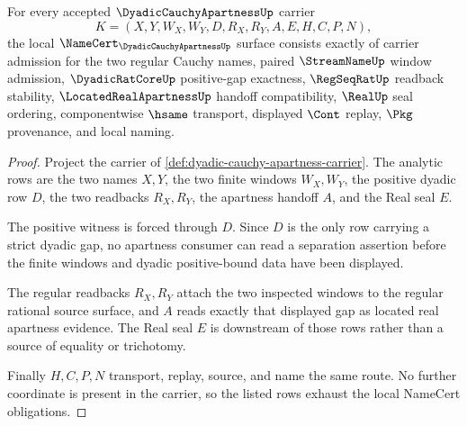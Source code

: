 \begin{theorem}
\label{thm:dyadic-cauchy-apartness-namecert-obligations}
For every accepted $\DyadicCauchyApartnessUp$ carrier
$$
K=(X,Y,W_X,W_Y,D,R_X,R_Y,A,E,H,C,P,N),
$$
the local $\NameCert_{\DyadicCauchyApartnessUp}$ surface consists exactly of carrier admission for the two regular Cauchy names, paired $\StreamNameUp$ window admission, $\DyadicRatCoreUp$ positive-gap exactness, $\RegSeqRatUp$ readback stability, $\LocatedRealApartnessUp$ handoff compatibility, $\RealUp$ seal ordering, componentwise $\hsame$ transport, displayed $\Cont$ replay, $\Pkg$ provenance, and local naming.
\end{theorem}
\begin{proof}
Project the carrier of \autoref{def:dyadic-cauchy-apartness-carrier}. The analytic rows are the two names $X,Y$, the two finite windows $W_X,W_Y$, the positive dyadic row $D$, the two readbacks $R_X,R_Y$, the apartness handoff $A$, and the Real seal $E$.

The positive witness is forced through $D$. Since $D$ is the only row carrying a strict dyadic gap, no apartness consumer can read a separation assertion before the finite windows and dyadic positive-bound data have been displayed.

The regular readbacks $R_X,R_Y$ attach the two inspected windows to the regular rational source surface, and $A$ reads exactly that displayed gap as located real apartness evidence. The Real seal $E$ is downstream of those rows rather than a source of equality or trichotomy.

Finally $H,C,P,N$ transport, replay, source, and name the same route. No further coordinate is present in the carrier, so the listed rows exhaust the local NameCert obligations.
\end{proof}

